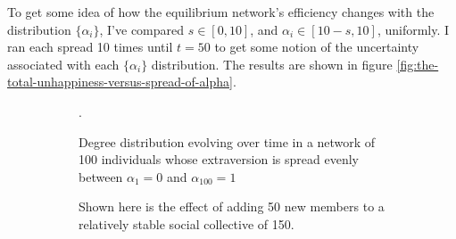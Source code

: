\documentclass[]{article}
\begin{document}
	To get some idea of how the equilibrium network's efficiency changes with the distribution $\{\alpha_i\}$, I've compared $s\in[0, 10]$, and $\alpha_i \in [10-s, 10]$, uniformly. I ran each spread 10 times until $t=50$ to get some notion of the uncertainty associated with each $\{\alpha_i\}$ distribution. The results are shown in figure \ref{fig:the-total-unhappiness-versus-spread-of-alpha}.
	
	\begin{figure}
		\centering
		\begin{subfigure}{1\textwidth}
			\caption{Degree distribution evolving over time in a network of 100 individuals whose extraversion is spread evenly between $\alpha_1 = 0$ and $\alpha_{100} = 1$}.
			\label{fig:degreedistributionuniformlydistributedalpha}
		\end{subfigure}
		\begin{subfigure}{1\textwidth}
			\caption{Shown here is the effect of adding 50 new members to a relatively stable social collective of 150.}
			\label{fig:frequencydistafternewmembers}
		\end{subfigure}
		\caption{}
	\end{figure}
	
\end{document}
